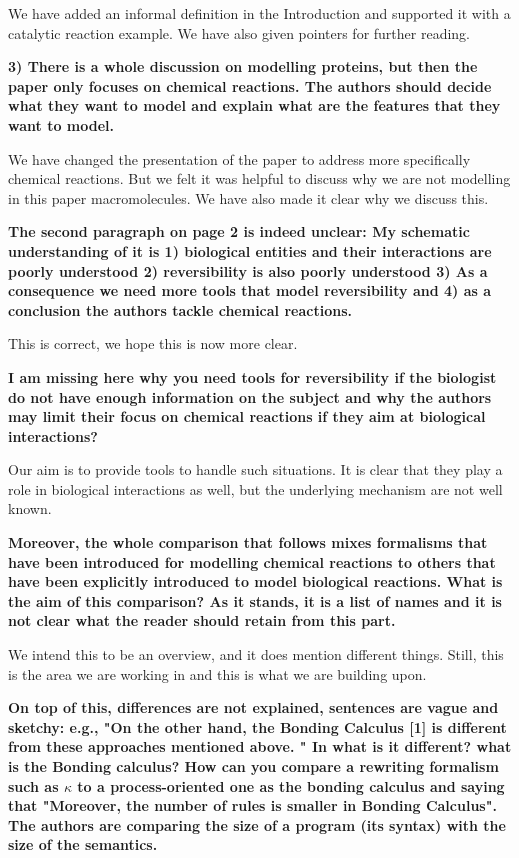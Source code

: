 \documentclass{article}
\begin{document}
We have
added an informal definition in the Introduction and supported it with a catalytic reaction 
example. We have also given pointers for further reading.

\textbf{3) There is a whole discussion on modelling proteins, but then the paper only focuses on chemical reactions. 
The authors should decide what they want to model and explain what are the features that they want to model.}

We have changed the presentation of the paper to address more specifically chemical reactions.
But we felt it was helpful to discuss why we are not modelling in this paper macromolecules. 
We have also made it clear why we discuss this.

\textbf{The second paragraph on page 2 is indeed unclear:
My schematic understanding of it is 1) biological entities and their interactions are poorly understood 2) reversibility is also poorly understood 3) As a consequence we need more tools that model reversibility and 4) as a conclusion the authors tackle chemical reactions.}

This is correct, we hope this is now more clear.

\textbf{I am missing here why you need tools for reversibility if the biologist do not have enough information on the subject and why the authors may limit their focus on chemical reactions if they aim at biological interactions?}

Our aim is to provide tools to handle such situations. It is clear that they play a role in biological interactions as well, but the underlying mechanism are not well known.

\textbf{Moreover, the whole comparison that follows mixes formalisms that have been introduced for modelling chemical reactions to others that have been explicitly introduced to model biological reactions. What is the aim of this comparison? As it stands, it is a list of names and it is not clear what the reader should retain from this part.}

We intend this to be an overview, and it does mention different things. Still, this is the area we are working in and this is what we are building upon.

\textbf{On top of this, differences are not explained, sentences are vague and sketchy:
 e.g., "On the other hand, the Bonding Calculus [1] is different from these approaches mentioned above. "
 In what is it different?  what is the Bonding calculus?
How can you compare a rewriting formalism such as $\kappa$ to a process-oriented one as the bonding calculus and saying that "Moreover, the number of rules is smaller in Bonding Calculus". The authors are comparing the size of a program (its syntax) with the size of the semantics.}
\end{document}
